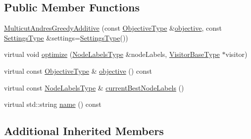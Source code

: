 \subsection*{Public Member Functions}
\begin{DoxyCompactItemize}
\item 
\hyperlink{classnifty_1_1graph_1_1opt_1_1multicut_1_1MulticutAndresGreedyAdditive_a44ba4889e29b27ef8dbf1825e8bde667}{Multicut\+Andres\+Greedy\+Additive} (const \hyperlink{classnifty_1_1graph_1_1opt_1_1multicut_1_1MulticutAndres_aed60c2f4ed9c6c6b97e8b513d7a48e86}{Objective\+Type} \&\hyperlink{classnifty_1_1graph_1_1opt_1_1multicut_1_1MulticutAndresGreedyAdditive_a75661ba64e38f54afa83f9006f6d4586}{objective}, const \hyperlink{structnifty_1_1graph_1_1opt_1_1multicut_1_1MulticutAndresGreedyAdditive_1_1SettingsType}{Settings\+Type} \&settings=\hyperlink{structnifty_1_1graph_1_1opt_1_1multicut_1_1MulticutAndresGreedyAdditive_1_1SettingsType}{Settings\+Type}())
\item 
virtual void \hyperlink{classnifty_1_1graph_1_1opt_1_1multicut_1_1MulticutAndresGreedyAdditive_a174b41a0f08004dbfe35be189f287446}{optimize} (\hyperlink{classnifty_1_1graph_1_1opt_1_1multicut_1_1MulticutAndres_a6cd9d64abc4a98aa9745ce1ef0d4ecfe}{Node\+Labels\+Type} \&node\+Labels, \hyperlink{classnifty_1_1graph_1_1opt_1_1multicut_1_1MulticutAndres_a295da342b6ebe8a8720cadd1dcce2e57}{Visitor\+Base\+Type} $\ast$visitor)
\item 
virtual const \hyperlink{classnifty_1_1graph_1_1opt_1_1multicut_1_1MulticutAndres_aed60c2f4ed9c6c6b97e8b513d7a48e86}{Objective\+Type} \& \hyperlink{classnifty_1_1graph_1_1opt_1_1multicut_1_1MulticutAndresGreedyAdditive_a75661ba64e38f54afa83f9006f6d4586}{objective} () const
\item 
virtual const \hyperlink{classnifty_1_1graph_1_1opt_1_1multicut_1_1MulticutAndres_a6cd9d64abc4a98aa9745ce1ef0d4ecfe}{Node\+Labels\+Type} \& \hyperlink{classnifty_1_1graph_1_1opt_1_1multicut_1_1MulticutAndresGreedyAdditive_aed65f0ad0252b0cf069a969633271757}{current\+Best\+Node\+Labels} ()
\item 
virtual std\+::string \hyperlink{classnifty_1_1graph_1_1opt_1_1multicut_1_1MulticutAndresGreedyAdditive_a2e3775af34622f15e57c60986e2d15d4}{name} () const
\end{DoxyCompactItemize}
\subsection*{Additional Inherited Members}



